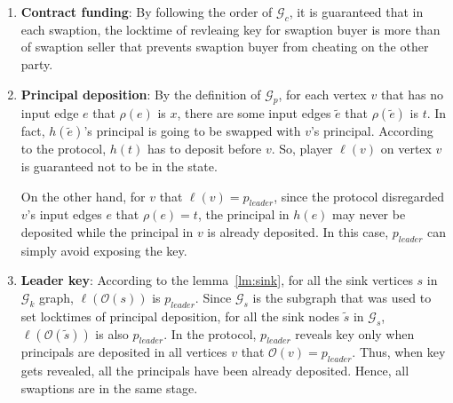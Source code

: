 \begin{enumerate}
    \item \textbf{Contract funding}: By following the order of $\mathcal{G}_{c}$, it is guaranteed that in each swaption, the locktime of revleaing \Aone key for swaption buyer is more than of swaption seller that prevents swaption buyer from cheating on the other party.
    \item \textbf{Principal deposition}: By the definition of $\mathcal{G}_{p}$, for each vertex $v$ that has no input edge $e$ that $\rho(e)$ is $x$, there are some input edges $\tilde{e}$ that $\rho(\tilde{e})$ is $t$.
    In fact, $h(\tilde{e})$'s principal is going to be swapped with $v$'s principal. According to the protocol, $h(t)$ has to deposit before $v$. So, player $\ell(v)$ on vertex $v$ is guaranteed not to be in the \underwater state.
    
    On the other hand, for $v$ that $\ell(v) = p_{leader}$, since the protocol disregarded $v$'s input edges $e$ that $\rho(e) = t$, the principal in $h(e)$ may never be deposited while the principal in $v$ is already deposited. In this case, $p_{leader}$ can simply avoid exposing the \keyone key.
    
    \item \textbf{Leader key}: According to the lemma~\ref{lm:sink}, for all the sink vertices $s$ in $\mathcal{G}_k$ graph, $\ell(\mathcal{O}(s))$ is $p_{leader}$. Since $\mathcal{G}_s$ is the subgraph that was used to set locktimes of principal deposition, for all the sink nodes $\tilde{s}$ in $\mathcal{G}_s$, $\ell(\mathcal{O}(\tilde{s}))$ is also $p_{leader}$.
    In the protocol, $p_{leader}$ reveals \keyone key only when principals are deposited in all vertices $v$ that $\mathcal{O}(v) = p_{leader}$. 
    Thus, when \keyone key gets revealed, all the principals have been already deposited. Hence, all swaptions are in the same stage.
    
    
    

\end{enumerate}
